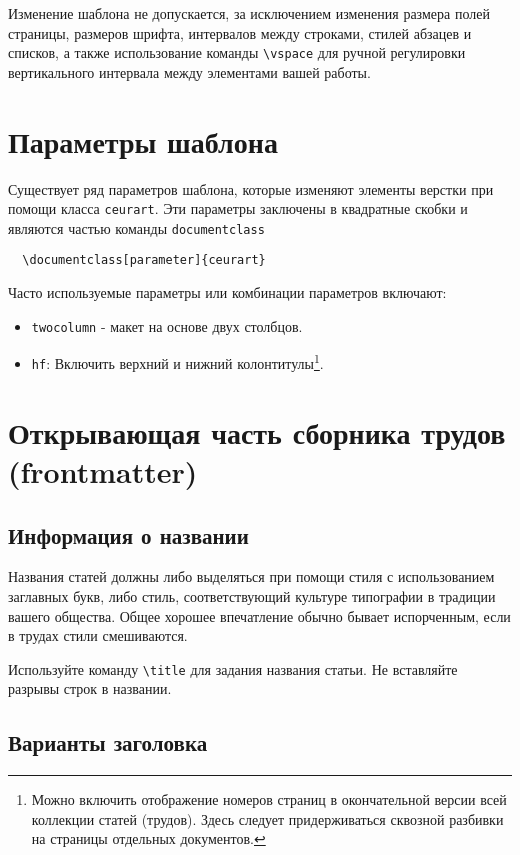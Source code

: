 \documentclass[
12pt,
babel,       %
firacode,    %
wordmath,      %
]{isdctart}
\begin{document}
Изменение шаблона не допускается, за исключением изменения размера полей страницы, размеров шрифта, интервалов между строками, стилей абзацев и списков, а также использование команды \verb|\vspace| для ручной регулировки вертикального интервала между элементами вашей работы.

\section{Параметры шаблона}

Существует ряд параметров шаблона, которые изменяют элементы верстки при помощи класса \verb|ceurart|. Эти параметры заключены в квадратные скобки и являются частью команды {\verb|documentclass|}
\begin{verbatim}
  \documentclass[parameter]{ceurart}
\end{verbatim}

Часто используемые параметры или комбинации параметров включают:
\begin{itemize}
\item {\verb|twocolumn|} - макет на основе двух столбцов.
\item {\verb|hf|}: Включить верхний и нижний колонтитулы\footnote{Можно включить отображение номеров страниц в окончательной версии всей коллекции статей (трудов). Здесь следует придерживаться сквозной разбивки на страницы отдельных документов.}.
\end{itemize}

\section{Открывающая часть сборника трудов (frontmatter)}

\subsection{Информация о названии}

Названия статей должны либо выделяться при помощи стиля с использованием заглавных букв, либо стиль, соответствующий культуре типографии в традиции вашего общества. Общее хорошее впечатление обычно бывает испорченным, если в трудах стили смешиваются.

Используйте команду \verb|\title| для задания названия статьи. Не вставляйте разрывы строк в названии.

\subsection{Варианты заголовка}
\end{document}
